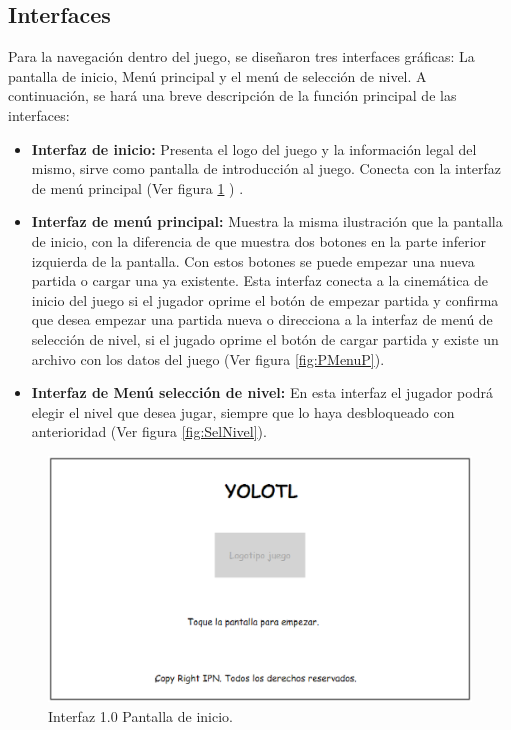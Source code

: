 \subsection{Interfaces}\label{TraReaInterfaces}
Para la navegación dentro del juego, se diseñaron tres interfaces gráficas: 
La pantalla de inicio, Menú principal y el menú de selección de nivel. 
A continuación, se hará una breve descripción de la función principal de 
las interfaces:
\begin{itemize}
	\item\textbf{ Interfaz de inicio:} Presenta el logo del juego y la información 
	legal del mismo, sirve como pantalla de introducción al juego. Conecta con 
	la interfaz de menú principal (Ver figura \ref{fig:PInicio} ) .
	\item \textbf{Interfaz de menú principal:} Muestra la misma ilustración que la 
	pantalla de inicio, con la diferencia de que muestra dos botones en la parte 
	inferior izquierda de la pantalla. Con estos botones se puede empezar una nueva 
	partida o cargar una ya existente. Esta interfaz conecta a la cinemática de 
	inicio del juego si el jugador oprime el botón de empezar partida y confirma 
	que desea empezar una partida nueva o direcciona a la interfaz de menú de 
	selección de nivel, si el jugado oprime el botón de cargar partida y existe 
	un archivo con los datos del juego (Ver figura \ref{fig:PMenuP}).
	\item \textbf{Interfaz de Menú selección de nivel:} En esta interfaz el 
	jugador podrá elegir el nivel que desea jugar, siempre que lo haya desbloqueado 
	con anterioridad (Ver figura \ref{fig:SelNivel}).
\end{itemize}

\begin{figure}
  \centering
   \includegraphics[width=0.6 \textwidth]{05TrabajoRealizado/01DocDiseno02/imagenes/interfaz00}
  \caption{Interfaz 1.0 Pantalla de inicio.}
  \label{fig:PInicio}
\end{figure} 


